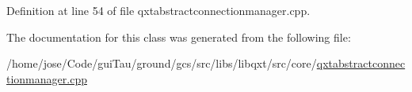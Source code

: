Definition at line 54 of file qxtabstractconnectionmanager.\-cpp.



The documentation for this class was generated from the following file\-:\begin{DoxyCompactItemize}
\item 
/home/jose/\-Code/gui\-Tau/ground/gcs/src/libs/libqxt/src/core/\hyperlink{qxtabstractconnectionmanager_8cpp}{qxtabstractconnectionmanager.\-cpp}\end{DoxyCompactItemize}
